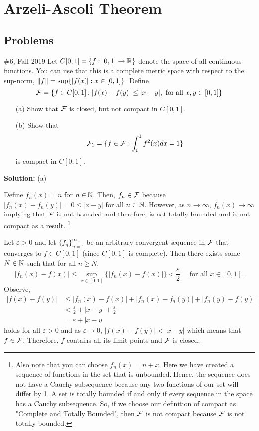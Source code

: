 \documentclass{article}
\begin{document}
\break

\section{Arzeli-Ascoli Theorem}

\subsection{Problems}

\begin{problem}{\#6, Fall 2019} Let $C[0,1] = \{f: [0,1]\to\mathbb R\}$ denote the space of all continuous functions. You can use that this is a complete metric space with respect to the sup-norm, $\left\lVert {f} \right\rVert = \sup\{|f(x)|: x\in[0,1]\}$. Define
	\[ \mathcal F = \{ f\in C[0,1] : |f(x) - f(y)| \leq |x-y|, \text{ for all } x,y\in[0,1]\}\]
\begin{enumerate}
	\item[(a)] Show that $\mathcal F$ is closed, but not compact in $C[0,1]$.
	\item[(b)] Show that 
		\[ \mathcal F_1 = \{ f\in \mathcal F : \int_0^1 f^2(x) dx = 1\} \]
	is compact in $C[0,1]$.
\end{enumerate}
\end{problem}

\textbf{Solution:} (a) 

Define $f_n(x) = n$ for $n\in \mathbb N$. Then, $f_n\in \mathcal F$ because $|f_n(x) - f_n(y)| = 0 \leq |x-y|$ for all $n\in \mathbb N$. However, as $n\to\infty$, $f_n(x) \to \infty$ implying that $\mathcal F$ is not bounded and therefore, is not totally bounded and is not compact as a result. \footnote{Also note that you can choose $f_n(x) = n+x$. Here we have created a sequence of functions in the set that is unbounded. Hence, the sequence does not have a Cauchy subsequence because any two functions of our set will differ by 1. A set is totally bounded if and only if every sequence in the space has a Cauchy subsequence. So, if we choose our definition of compact as "Complete and Totally Bounded", then $\mathcal F$ is not compact because $\mathcal F$ is not totally bounded.}

Let $\varepsilon > 0$ and let $\{f_n\}_{n=1}^\infty$ be an arbitrary convergent sequence in $\mathcal F$ that converges to $f\in C[0,1]$ (since $C[0,1]$ is complete). Then there exists some $N\in\mathbb N$ such that for all $n\geq N$, 
	\[ |f_n(x) - f(x)| \leq \sup_{x\in [0,1]}\{|f_n(x) - f(x)|\} < \frac{\varepsilon}{2}\quad \text{ for all } x\in [0,1].\]
Observe,
	\begin{align*}
		|f(x) - f(y)| & \leq |f_n(x) - f(x)| + |f_n(x) - f_n(y)| + |f_n(y) - f(y)|\\
				& < \frac{\varepsilon}{2} + |x-y| + \frac{\varepsilon}{2}\\
				& = \varepsilon + |x-y|
	\end{align*}
holds for all $\varepsilon > 0$ and as $\varepsilon \to 0$, $|f(x) - f(y)| < |x-y|$ which means that $f\in \mathcal F$. Therefore, $f$ contains all its limit points and $\mathcal F$ is closed.
\end{document}
